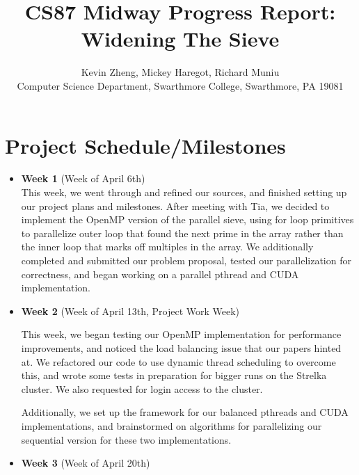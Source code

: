 \documentclass[11pt]{article}
\begin{document}
\title{CS87 Midway Progress Report: Widening The Sieve}

\author{Kevin Zheng, Mickey Haregot, Richard Muniu\\
Computer Science Department, Swarthmore College, Swarthmore, PA  19081}

\maketitle

\section{Project Schedule/Milestones}

\begin{itemize}
    \item \textbf{Week 1} (Week of April 6th) \\
     This week, we went through and refined our sources, and finished setting up our 
     project plans and milestones. After meeting with Tia, we decided to implement
     the OpenMP version of the parallel sieve, using for loop primitives to parallelize
     outer loop that found the next prime in the array rather than the inner loop that 
     marks off multiples in the array. We additionally completed and submitted our problem
     proposal, tested our parallelization for correctness, and began working on a parallel
     pthread and CUDA implementation. 
     \vspace{0.1in}
     
    \item \textbf{Week 2} (Week of April 13th, Project Work Week)
    
     This week, we began testing our OpenMP implementation for performance improvements,
     and noticed the load balancing issue that our papers hinted at. We refactored our code
     to use dynamic thread scheduling to overcome this, and wrote some tests in preparation
     for bigger runs on the Strelka cluster. We also requested for login access to the 
     cluster.
     
     Additionally, we set up the framework for our balanced pthreads and CUDA 
     implementations, and brainstormed on algorithms for parallelizing our sequential version
     for these two implementations.
     \vspace{0.1in}
     
    \item \textbf{Week 3} (Week of April 20th)
    

\end{itemize}
\end{document}
